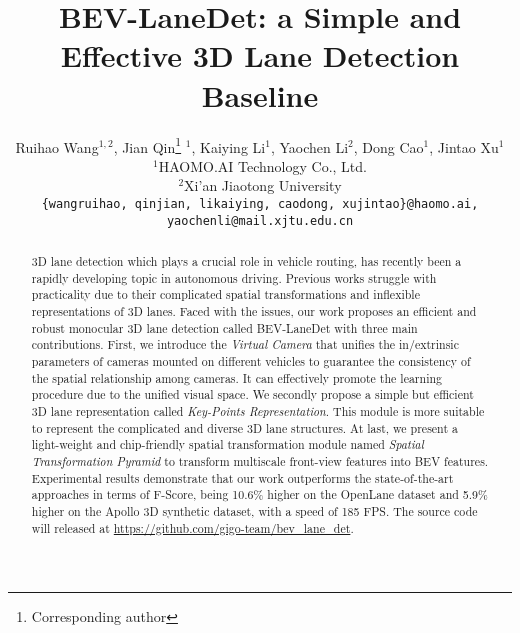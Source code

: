 \documentclass[10pt,twocolumn,letterpaper]{article}
\begin{document}
\title{BEV-LaneDet: a Simple and Effective 3D Lane Detection Baseline}

\author{Ruihao Wang$^{1,2}$, Jian Qin\thanks{Corresponding author} $^{1}$, Kaiying Li$^{1}$, Yaochen Li$^{2}$, Dong Cao$^{1}$, Jintao Xu$^{1}$\\
$^{1}$HAOMO.AI Technology Co., Ltd.\\
$^{2}$Xi’an Jiaotong University\\
{\tt\small  \{wangruihao, qinjian, likaiying, caodong, xujintao\}@haomo.ai, yaochenli@mail.xjtu.edu.cn} }
\maketitle

\begin{abstract}
   3D lane detection which plays a crucial role in vehicle routing, has recently been a rapidly developing topic in autonomous driving. Previous works struggle with practicality due to their complicated spatial transformations and inflexible representations of 3D lanes. Faced with the issues, our work proposes an efficient and robust monocular 3D lane detection called BEV-LaneDet with three main contributions. First, we introduce the \textit{Virtual Camera} that unifies the in/extrinsic parameters of cameras mounted on different vehicles to guarantee the consistency of the spatial relationship among cameras. It can effectively promote the learning procedure due to the unified visual space. We secondly propose a simple but efficient 3D lane representation called \textit{Key-Points Representation}. This module is more suitable to represent the complicated and diverse 3D lane structures. At last, we present a light-weight and chip-friendly spatial transformation module named \textit{Spatial Transformation Pyramid} to transform multiscale front-view features into BEV features. Experimental results demonstrate that our work outperforms the state-of-the-art approaches in terms of F-Score, being 10.6\% higher on the OpenLane dataset and 5.9\% higher on the Apollo 3D synthetic dataset, with a speed of 185 FPS. The source code will released at \url{https://github.com/gigo-team/bev_lane_det}.
\end{abstract}
\end{document}
